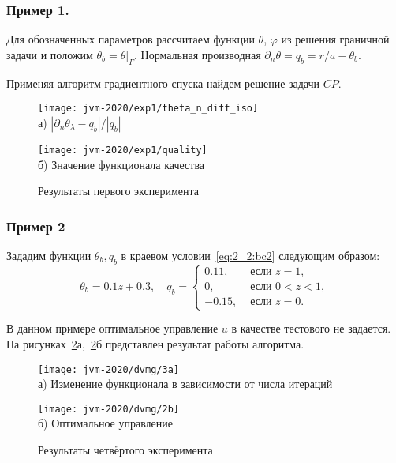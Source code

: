 \begin{frame}
    \frametitle{Пример 1.}
    Для обозначенных параметров рассчитаем функции $\theta$, $\varphi$ из решения граничной задачи
    и положим $\theta_b = \theta|_\Gamma$.
    Нормальная производная $\partial_n \theta = q_b = r / a - \theta_b$.

    Применяя алгоритм градиентного спуска найдем решение задачи $CP$.
    \begin{figure}[h!t]
        \begin{minipage}[b][][b]{0.49\linewidth}
            \centering
            \texttt{[image: jvm-2020/exp1/theta\_n\_diff\_iso]}
            \\ а) $|\partial_n\theta_\lambda-q_b|/|q_b|$
        \end{minipage}
        \hfill
        \begin{minipage}[b][][b]{0.49\linewidth}
            \centering
            \texttt{[image: jvm-2020/exp1/quality]}
            \\ б) Значение функционала качества
        \end{minipage}
        \caption{Результаты первого эксперимента}
        \label{fig:4_4:0}
    \end{figure}
\end{frame}

\begin{frame}
    \frametitle{Пример 2}
    Зададим функции $\theta_{b}, q_{b}$ в краевом условии~\eqref{eq:2_2:bc2}
    следующим образом:
    \[
        \theta_{b}=0.1 z+0.3, \quad q_{b}=
        \begin{cases}
            0.11, & \text { если } z=1, \\
            0, & \text { если } 0<z<1, \\
            -0.15, & \text { если } z=0.
        \end{cases}
    \]

    В данном примере оптимальное управление $u$ в качестве тестового не задается.
    На рисунках~\ref{fig:4_4:3}а,~\ref{fig:4_4:3}б представлен результат работы алгоритма.

    \begin{figure}[h!t]
        \begin{minipage}[b][][b]{0.49\linewidth}
            \centering
            \texttt{[image: jvm-2020/dvmg/3a]}
            \\ а) Изменение функционала в зависимости от числа итераций
        \end{minipage}
        \hfill
        \begin{minipage}[b][][b]{0.49\linewidth}
            \centering
            \texttt{[image: jvm-2020/dvmg/2b]}
            \\ б) Оптимальное управление
        \end{minipage}
        \caption{Результаты четвёртого эксперимента}
        \label{fig:4_4:3}
    \end{figure}

\end{frame}

